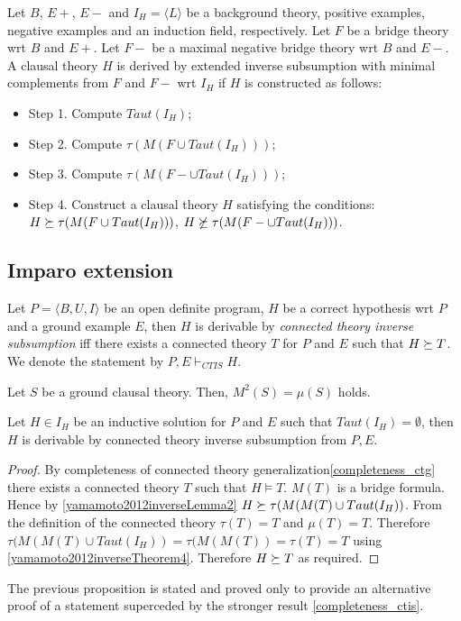 \begin{defn}
Let $B$, $E+$, $E-$ and $I_H = \langle L \rangle$ be a background theory, positive examples, negative examples and an induction field, respectively.
Let $F$ be a bridge theory wrt $B$ and $E+$. Let $F-$ be a maximal negative bridge theory wrt $B$ and $E-$. A clausal theory $H$ is derived
by extended inverse subsumption with minimal complements from $F$ and $F-$ wrt $I_H$ if $H$ is constructed as
follows:
\begin{itemize}
\item Step 1. Compute $Taut(I_H)$;
\item Step 2. Compute $\tau(M(F \cup Taut(I_H)))$;
\item Step 3. Compute $\tau(M(F- \cup Taut(I_H)))$;
\item Step 4. Construct a clausal theory $H$ satisfying the conditions:
$H \succeq \tau(M(F \cup Taut(I_H)))$,
$H \not\succeq \tau(M(F- \cup Taut(I_H)))$.
\end{itemize}
\end{defn}

\subsection{Imparo extension}
\begin{defn}
Let $P=\langle B, U, I \rangle$ be an open definite program, $H$ be a correct hypothesis wrt $P$ and a ground example $E$, then $H$ is derivable by
\emph{connected theory inverse subsumption}
iff there exists a connected theory $T$ for $P$ and $E$ such that $H \succeq T$.
We denote the statement by $P, E \vdash_{CTIS} H$.
\end{defn}

\begin{thm}\label{yamamoto2012inverseTheorem4}\cite{yamamoto2012inverse}
Let $S$ be a ground clausal theory. Then, $M^2(S) = \mu(S)$ holds.
\end{thm}

\begin{proposition}
Let $H \in I_H$ be an inductive solution for $P$ and $E$ such that $Taut(I_H)=\emptyset$, then $H$ is derivable by connected theory inverse subsumption from $P, E$.
\end{proposition}
\begin{proof}
By completeness of connected theory generalization\ref{completeness_ctg} there exists a connected theory $T$ such that $H \models T$. $M(T)$ is a bridge formula.
Hence by \ref{yamamoto2012inverseLemma2}
$H \succeq \tau(M(M(T) \cup Taut(I_H))$. From the definition of the connected theory $\tau(T)=T$ and $\mu (T)=T$.
Therefore $\tau(M(M(T) \cup Taut(I_H))=\tau(M(M(T))=\tau(T)=T$ using
\ref{yamamoto2012inverseTheorem4}. Therefore $H \succeq T$ as required.
\end{proof}
\begin{remark}
The previous proposition is stated and proved only to provide an alternative proof of a statement superceded by the stronger result \ref{completeness_ctis}.
\end{remark}

